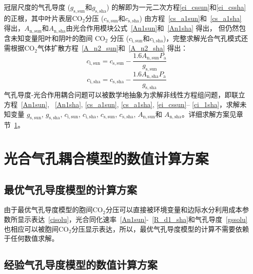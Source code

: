 冠层尺度的气孔导度 ($g_{\mathrm{s,sun}}$和$g_{\mathrm{s,sha}}$) 的解即为一元二次方程\eqref{ei_cssun}和\eqref{ei_cssha}的正根，其中叶片表层$\mathrm{CO_2}$分压 ($c_{\mathrm{s,sun}}$和$c_{\mathrm{s,sha}}$) 由方程~\eqref{cs_a1sun}和~\eqref{cs_a1sha} 得出，$A_{\mathrm{n,sun}}$和$A_{\mathrm{n,sha}}$由光合作用模块公式~\eqref{An1sun}和~\eqref{An1sha} 得出，
但仍然包含未知变量阳叶和阴叶的胞间 $\mathrm{CO_2}$ 分压 ($c_{\mathrm{i,sun}}$和$c_{\mathrm{i,sha}}$)，完整求解光合气孔模式还需根据$\mathrm{CO_2}$气体扩散方程~\eqref{A_n2_sun}和~\eqref{A_n2_sha} 得出：
\begin{equation}\label{ci_1sun}
c_{\mathrm{i,sun}}=c_{\mathrm{s,sun}}-\frac{1.6 A_{\mathrm{n,sun}} P_{\mathrm {a}}}{g_{\mathrm{s,sun}}}
\end{equation}
\begin{equation}\label{ci_1sha}
c_{\mathrm{i,sha}}=c_{\mathrm{s,sha}}-\frac{1.6 A_{\mathrm{n,sha}} P_{\mathrm {a}}}{g_{\mathrm{s,sha}}}
\end{equation}
气孔导度-光合作用耦合问题可以被数学地抽象为求解非线性方程组问题，即联立方程~\eqref{An1sun}, ~\eqref{An1sha}, \eqref{cs_a1sun}, \eqref{cs_a1sha}, \eqref{ei_cssun}--%
\eqref{ci_1sha}，求解未知变量 $g_{\mathrm{s,sun}}$, $g_{\mathrm{s,sha}}$, $c_{\mathrm{i,sun}}$, $c_{\mathrm{i,sha}}$, $c_{\mathrm{s,sun}}$, $c_{\mathrm{s,sha}}$, $A_{\mathrm{n,sun}}$和 $A_{\mathrm{n,sha}}$。详细求解方案见章节~\ref{光合气孔耦合模型的数值计算方案}。


\section{光合气孔耦合模型的数值计算方案}\label{光合气孔耦合模型的数值计算方案}

\subsection{最优气孔导度模型的计算方案}

由于最优气孔导度模型的胞间$\mathrm {CO_2}$分压可以直接被环境变量和边际水分利用成本参数所显示表达~\eqref{cisolu}，光合同化速率~\eqref{An1sun}-~\eqref{R_d1_sha}和气孔导度~\eqref{gssolu}也相应可以被胞间$\mathrm {CO_2}$分压显示表达，所以，最优气孔导度模型的计算不需要依赖于任何数值求解。

\subsection{经验气孔导度模型的数值计算方案}

